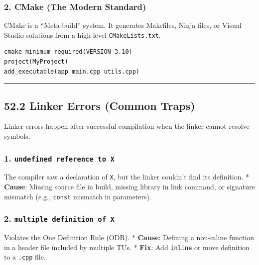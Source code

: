 \hypertarget{cmake-the-modern-standard}{%
\subsubsection{2. CMake (The Modern
Standard)}\label{cmake-the-modern-standard}}

CMake is a ``Meta-build'' system. It generates Makefiles, Ninja files,
or Visual Studio solutions from a high-level
\passthrough{\lstinline!CMakeLists.txt!}.

\begin{lstlisting}
cmake_minimum_required(VERSION 3.10)
project(MyProject)
add_executable(app main.cpp utils.cpp)
\end{lstlisting}

\begin{center}\rule{0.5\linewidth}{0.5pt}\end{center}

\hypertarget{linker-errors-common-traps}{%
\subsection{52.2 Linker Errors (Common
Traps)}\label{linker-errors-common-traps}}

Linker errors happen after successful compilation when the linker cannot
resolve symbols.

\hypertarget{undefined-reference-to-x}{%
\subsubsection{\texorpdfstring{1.
\texttt{undefined\ reference\ to\ \textquotesingle{}X\textquotesingle{}}}{1. undefined reference to 'X'}}\label{undefined-reference-to-x}}

The compiler saw a declaration of \passthrough{\lstinline!X!}, but the
linker couldn't find its definition. * \textbf{Cause}: Missing source
file in build, missing library in link command, or signature mismatch
(e.g., \passthrough{\lstinline!const!} mismatch in parameters).

\hypertarget{multiple-definition-of-x}{%
\subsubsection{\texorpdfstring{2.
\texttt{multiple\ definition\ of\ \textquotesingle{}X\textquotesingle{}}}{2. multiple definition of 'X'}}\label{multiple-definition-of-x}}

Violates the One Definition Rule (ODR). * \textbf{Cause}: Defining a
non-inline function in a header file included by multiple TUs. *
\textbf{Fix}: Add \passthrough{\lstinline!inline!} or move definition to
a \passthrough{\lstinline!.cpp!} file.

